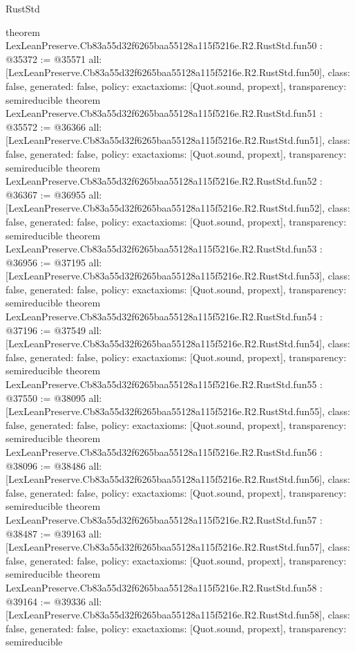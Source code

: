 \begin{lexlean}{RustStd}
\begin{coremodule}
{}
theorem LexLeanPreserve.Cb83a55d32f6265baa55128a115f5216e.R2.RustStd.fun50 : @35372 := @35571 {
  all: [LexLeanPreserve.Cb83a55d32f6265baa55128a115f5216e.R2.RustStd.fun50],
  class: false,
  generated: false,
  policy: exact{axioms: [Quot.sound, propext]},
  transparency: semireducible
}
theorem LexLeanPreserve.Cb83a55d32f6265baa55128a115f5216e.R2.RustStd.fun51 : @35572 := @36366 {
  all: [LexLeanPreserve.Cb83a55d32f6265baa55128a115f5216e.R2.RustStd.fun51],
  class: false,
  generated: false,
  policy: exact{axioms: [Quot.sound, propext]},
  transparency: semireducible
}
theorem LexLeanPreserve.Cb83a55d32f6265baa55128a115f5216e.R2.RustStd.fun52 : @36367 := @36955 {
  all: [LexLeanPreserve.Cb83a55d32f6265baa55128a115f5216e.R2.RustStd.fun52],
  class: false,
  generated: false,
  policy: exact{axioms: [Quot.sound, propext]},
  transparency: semireducible
}
theorem LexLeanPreserve.Cb83a55d32f6265baa55128a115f5216e.R2.RustStd.fun53 : @36956 := @37195 {
  all: [LexLeanPreserve.Cb83a55d32f6265baa55128a115f5216e.R2.RustStd.fun53],
  class: false,
  generated: false,
  policy: exact{axioms: [Quot.sound, propext]},
  transparency: semireducible
}
theorem LexLeanPreserve.Cb83a55d32f6265baa55128a115f5216e.R2.RustStd.fun54 : @37196 := @37549 {
  all: [LexLeanPreserve.Cb83a55d32f6265baa55128a115f5216e.R2.RustStd.fun54],
  class: false,
  generated: false,
  policy: exact{axioms: [Quot.sound, propext]},
  transparency: semireducible
}
theorem LexLeanPreserve.Cb83a55d32f6265baa55128a115f5216e.R2.RustStd.fun55 : @37550 := @38095 {
  all: [LexLeanPreserve.Cb83a55d32f6265baa55128a115f5216e.R2.RustStd.fun55],
  class: false,
  generated: false,
  policy: exact{axioms: [Quot.sound, propext]},
  transparency: semireducible
}
theorem LexLeanPreserve.Cb83a55d32f6265baa55128a115f5216e.R2.RustStd.fun56 : @38096 := @38486 {
  all: [LexLeanPreserve.Cb83a55d32f6265baa55128a115f5216e.R2.RustStd.fun56],
  class: false,
  generated: false,
  policy: exact{axioms: [Quot.sound, propext]},
  transparency: semireducible
}
theorem LexLeanPreserve.Cb83a55d32f6265baa55128a115f5216e.R2.RustStd.fun57 : @38487 := @39163 {
  all: [LexLeanPreserve.Cb83a55d32f6265baa55128a115f5216e.R2.RustStd.fun57],
  class: false,
  generated: false,
  policy: exact{axioms: [Quot.sound, propext]},
  transparency: semireducible
}
theorem LexLeanPreserve.Cb83a55d32f6265baa55128a115f5216e.R2.RustStd.fun58 : @39164 := @39336 {
  all: [LexLeanPreserve.Cb83a55d32f6265baa55128a115f5216e.R2.RustStd.fun58],
  class: false,
  generated: false,
  policy: exact{axioms: [Quot.sound, propext]},
  transparency: semireducible
}
\end{coremodule}
\end{lexlean}
